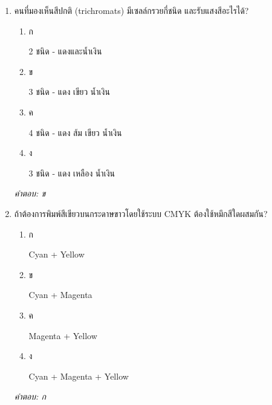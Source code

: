 \documentclass[12pt]{article}
\begin{document}
\begin{enumerate}[label=\arabic*., itemsep=0.5\baselineskip, topsep=0.5\baselineskip, leftmargin=*]
\item คนที่มองเห็นสีปกติ (trichromats) มีเซลล์กรวยกี่ชนิด และรับแสงสีอะไรได้?
\begin{enumerate}[label=\alph*)., itemsep=0.3\baselineskip, topsep=0.3\baselineskip]
\item ก\ 
\begin{minipage}[t]{0.9\linewidth}
\raggedright 2 ชนิด - แดงและน้ำเงิน
\end{minipage}
\item ข\ 
\begin{minipage}[t]{0.9\linewidth}
\raggedright 3 ชนิด - แดง เขียว น้ำเงิน
\end{minipage}
\item ค\ 
\begin{minipage}[t]{0.9\linewidth}
\raggedright 4 ชนิด - แดง ส้ม เขียว น้ำเงิน
\end{minipage}
\item ง\ 
\begin{minipage}[t]{0.9\linewidth}
\raggedright 3 ชนิด - แดง เหลือง น้ำเงิน
\end{minipage}
\end{enumerate}
\vspace{-0.3\baselineskip}
\begin{small}
\textit{คำตอบ: ข}
\end{small}

\item ถ้าต้องการพิมพ์สีเขียวบนกระดาษขาวโดยใช้ระบบ CMYK ต้องใช้หมึกสีใดผสมกัน?
\begin{enumerate}[label=\alph*)., itemsep=0.3\baselineskip, topsep=0.3\baselineskip]
\item ก\ 
\begin{minipage}[t]{0.9\linewidth}
\raggedright Cyan + Yellow
\end{minipage}
\item ข\ 
\begin{minipage}[t]{0.9\linewidth}
\raggedright Cyan + Magenta
\end{minipage}
\item ค\ 
\begin{minipage}[t]{0.9\linewidth}
\raggedright Magenta + Yellow
\end{minipage}
\item ง\ 
\begin{minipage}[t]{0.9\linewidth}
\raggedright Cyan + Magenta + Yellow
\end{minipage}
\end{enumerate}
\vspace{-0.3\baselineskip}
\begin{small}
\textit{คำตอบ: ก}
\end{small}


\end{enumerate}
\end{document}
